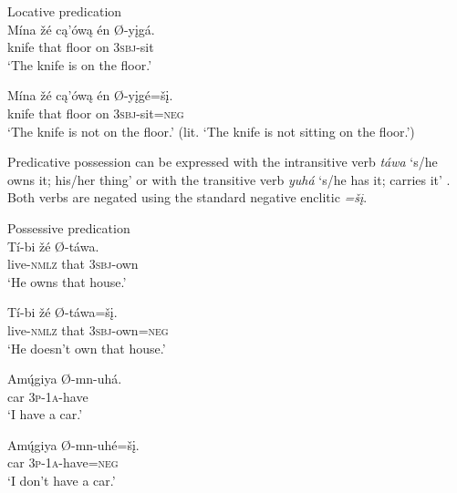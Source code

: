 \documentclass[output=paper,colorlinks,citecolor=brown]{langscibook}
\begin{document}
\ea\label{ex:nak:26}{Locative predication} \\
    \ea\label{ex:nak:26a}
        \gll Mína žé cą’ówą én Ø-yįgá. \\
             knife that floor on \textsc{3sbj}-sit \\
        \glt ‘The knife is on the floor.’
    
    \ex\label{ex:nak:26b}
        \gll Mína žé cą’ówą én Ø-yįgé=šį. \\
             knife that floor on \textsc{3sbj}-sit=\textsc{neg} \\
        \glt ‘The knife is not on the floor.’ (lit. ‘The knife is not sitting on the floor.')
    \z
\z 

Predicative possession can be expressed with the intransitive verb \textit{táwa} ‘s/he owns it; his/her thing’  or with the transitive verb \textit{yuhá} ‘s/he has it; carries it’ . Both verbs are negated using the standard negative enclitic \textit{=šį}.

\ea\label{ex:nak:27}{Possessive predication}\\
    \ea\label{ex:nak:27a}
        \gll Tí-bi žé Ø-táwa. \\ 
             live-\textsc{nmlz} that \textsc{3sbj}-own \\
        \glt ‘He owns that house.’
    
    \ex\label{ex:nak:27b}
        \gll Tí-bi žé Ø-táwa=šį. \\
             live-\textsc{nmlz} that \textsc{3sbj}-own=\textsc{neg} \\
        \glt ‘He doesn’t own that house.’
    \z
\z 

\ea\label{ex:nak:28}
    \ea\label{ex:nak:28a}
        \gll Am\'{ų}giya Ø-mn-uhá. \\
             car \textsc{3p-1a}-have \\
        \glt ‘I have a car.’
    
    \ex\label{ex:nak:28b}
        \gll Am\'{ų}giya Ø-mn-uhé=šį. \\
             car \textsc{3p-1a}-have=\textsc{neg} \\
        \glt ‘I don’t have a car.’
    \z
\z 
\end{document}
